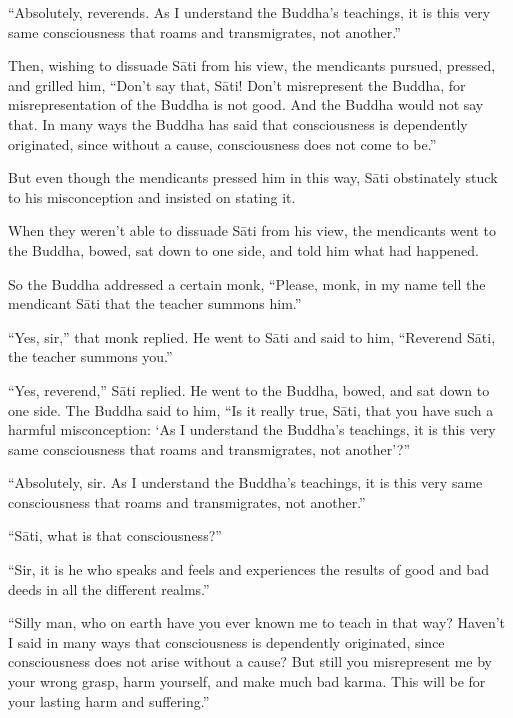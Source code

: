 \documentclass[12pt,openany]{book}%
\begin{document}
“Absolutely, reverends. As I understand the Buddha’s teachings, it is this very same consciousness that roams and transmigrates, not another.” 

Then, wishing to dissuade \textsanskrit{Sāti} from his view, the mendicants pursued, pressed, and grilled him, “Don’t say that, \textsanskrit{Sāti}! Don’t misrepresent the Buddha, for misrepresentation of the Buddha is not good. And the Buddha would not say that. In many ways the Buddha has said that consciousness is dependently originated, since without a cause, consciousness does not come to be.” 

But even though the mendicants pressed him in this way, \textsanskrit{Sāti} obstinately stuck to his misconception and insisted on stating it. 

When they weren’t able to dissuade \textsanskrit{Sāti} from his view, the mendicants went to the Buddha, bowed, sat down to one side, and told him what had happened. 

So the Buddha addressed a certain monk, “Please, monk, in my name tell the mendicant \textsanskrit{Sāti} that the teacher summons him.” 

“Yes, sir,” that monk replied. He went to \textsanskrit{Sāti} and said to him, “Reverend \textsanskrit{Sāti}, the teacher summons you.” 

“Yes, reverend,” \textsanskrit{Sāti} replied. He went to the Buddha, bowed, and sat down to one side. The Buddha said to him, “Is it really true, \textsanskrit{Sāti}, that you have such a harmful misconception: ‘As I understand the Buddha’s teachings, it is this very same consciousness that roams and transmigrates, not another’?” 

“Absolutely, sir. As I understand the Buddha’s teachings, it is this very same consciousness that roams and transmigrates, not another.” 

“\textsanskrit{Sāti}, what is that consciousness?” 

“Sir, it is he who speaks and feels and experiences the results of good and bad deeds in all the different realms.” 

“Silly man, who on earth have you ever known me to teach in that way? Haven’t I said in many ways that consciousness is dependently originated, since consciousness does not arise without a cause? But still you misrepresent me by your wrong grasp, harm yourself, and make much bad karma. This will be for your lasting harm and suffering.” 
\end{document}
